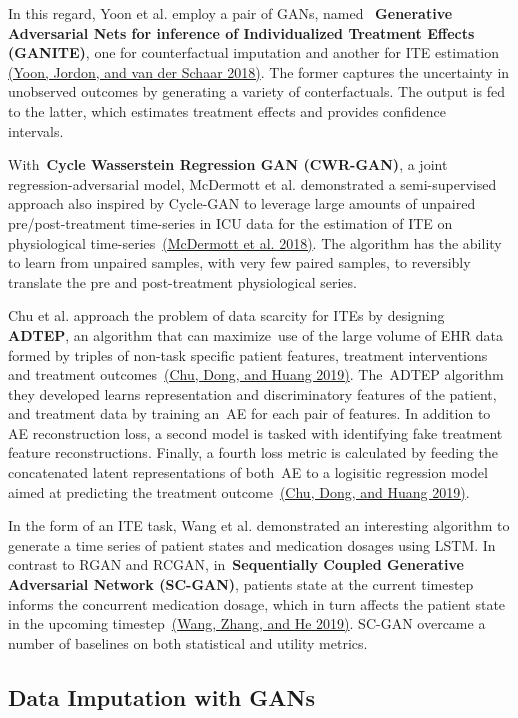 \documentclass[10pt]{article}
\begin{document}
In this regard, Yoon et al. employ a pair of GANs, named
~\textbf{Generative Adversarial Nets for inference of Individualized
Treatment Effects (GANITE)}, one for counterfactual imputation and
another for ITE estimation \hyperref[csl:21]{(Yoon, Jordon, and van der Schaar 2018)}. The former captures the
uncertainty in unobserved outcomes by generating a variety of
conterfactuals. The output is fed to the latter, which estimates
treatment effects and provides confidence intervals.~

With~\textbf{Cycle Wasserstein Regression GAN (CWR-GAN)}, a joint
regression-adversarial model, McDermott et al. demonstrated a
semi-supervised approach also inspired by Cycle-GAN to leverage large
amounts of unpaired pre/post-treatment time-series in ICU data for the
estimation of ITE on physiological time-series~\hyperref[csl:8]{(McDermott et al. 2018)}. The
algorithm has the ability to learn from unpaired samples, with very few
paired samples, to reversibly translate the pre and post-treatment
physiological series.~

Chu et al. approach the problem of data scarcity for ITEs by designing~
\textbf{ADTEP}, an algorithm that can maximize~use of the large volume
of EHR data formed by triples of non-task specific patient features,
treatment interventions and treatment outcomes~\hyperref[csl:26]{(Chu, Dong, and Huang 2019)}.
The~ADTEP algorithm they developed learns representation and
discriminatory features of the patient, and treatment data by training
an~AE for each pair of features. In addition to AE reconstruction loss,
a second model is tasked with identifying fake treatment feature
reconstructions. Finally, a fourth loss metric is calculated by feeding
the concatenated latent representations of both~AE to a logisitic
regression model aimed at predicting the treatment
outcome~\hyperref[csl:26]{(Chu, Dong, and Huang 2019)}.~

In the form of an ITE task, Wang et al. demonstrated an interesting
algorithm to generate a time series of patient states and medication
dosages using LSTM. In contrast to RGAN and RCGAN,
in~\textbf{Sequentially Coupled Generative Adversarial Network
(SC-GAN)}, patients state at the current timestep informs the concurrent
medication dosage, which in turn affects the patient state in the
upcoming timestep~\hyperref[csl:9]{(Wang, Zhang, and He 2019)}. SC-GAN overcame a number of
baselines on both statistical and utility metrics. ~

\subsection{Data Imputation with GANs}
\end{document}
